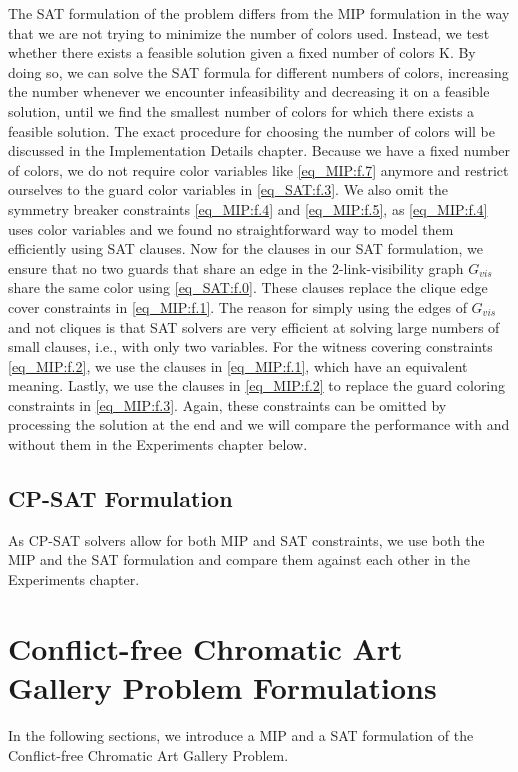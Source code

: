 The SAT formulation of the problem differs from the MIP formulation in the way that we are not trying to minimize the number of colors used. Instead, we test whether there exists a feasible solution given a fixed number of colors K. By doing so, we can solve the SAT formula for different numbers of colors, increasing the number whenever we encounter infeasibility and decreasing it on a feasible solution, until we find the smallest number of colors for which there exists a feasible solution. The exact procedure for choosing the number of colors will be discussed in the Implementation Details chapter. Because we have a fixed number of colors, we do not require color variables like \cref{eq_MIP:f.7} anymore and restrict ourselves to the guard color variables in \cref{eq_SAT:f.3}. We also omit the symmetry breaker constraints \cref{eq_MIP:f.4} and \cref{eq_MIP:f.5}, as \cref{eq_MIP:f.4} uses color variables and we found no straightforward way to model them efficiently using SAT clauses. Now for the clauses in our SAT formulation, we ensure that no two guards that share an edge in the 2-link-visibility graph $G_{vis}$ share the same color using \cref{eq_SAT:f.0}. These clauses replace the clique edge cover constraints in \cref{eq_MIP:f.1}. The reason for simply using the edges of $G_{vis}$ and not cliques is that SAT solvers are very efficient at solving large numbers of small clauses, i.e., with only two variables. For the witness covering constraints \cref{eq_MIP:f.2}, we use the clauses in \cref{eq_MIP:f.1}, which have an equivalent meaning. Lastly, we use the clauses in \cref{eq_MIP:f.2} to replace the guard coloring constraints in \cref{eq_MIP:f.3}. Again, these constraints can be omitted by processing the solution at the end and we will compare the performance with and without them in the Experiments chapter below.

\section{CP-SAT Formulation}

As CP-SAT solvers allow for both MIP and SAT constraints, we use both the MIP and the SAT formulation and compare them against each other in the Experiments chapter.

\chapter{Conflict-free Chromatic Art Gallery Problem Formulations}

In the following sections, we introduce a MIP and a SAT formulation of the Conflict-free Chromatic Art Gallery Problem.

